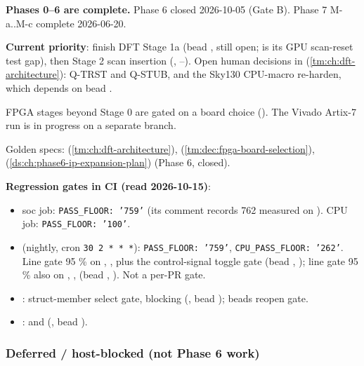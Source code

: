 \begin{record}

\textbf{Phases 0--6 are complete.} Phase 6 closed 2026-10-05 (Gate B).
Phase 7 M-a..M-c complete 2026-06-20.

\textbf{Current priority}: finish DFT Stage 1a (bead ,
still open;  is its GPU scan-reset test gap), then Stage 2
scan insertion (, --). Open human
decisions in  (\cref{tm:ch:dft-architecture}): Q-TRST and Q-STUB,
and the Sky130 CPU-macro re-harden, which depends on bead .

FPGA stages beyond Stage 0 are gated on a board choice ().
The Vivado Artix-7 run is in progress on a separate branch.

Golden specs:  (\cref{tm:ch:dft-architecture}),
 (\cref{tm:dec:fpga-board-selection}),
 (\cref{ds:ch:phase6-ip-expansion-plan}) (Phase 6, closed).

\textbf{Regression gates in CI (read 2026-10-15)}:

\begin{itemize}
\tightlist
\item
   soc job:
  \texttt{PASS\_\allowbreak{}FLOOR:\allowbreak{}\ '759'} (its comment
  records 762 measured on ). CPU job:
  \texttt{PASS\_\allowbreak{}FLOOR:\allowbreak{}\ '100'}.
\item
   (nightly, cron \texttt{30\ 2\ *\ *\ *}):
  \texttt{PASS\_\allowbreak{}FLOOR:\allowbreak{}\ '759'},
  \texttt{CPU\_\allowbreak{}PASS\_\allowbreak{}FLOOR:\allowbreak{}\ '262'}.
  Line gate 95 \% on , ,  plus
  the control-signal toggle gate (bead , ); line gate
  95 \% also on , ,  (bead
  , ). Not a per-PR gate.
\item
  : struct-member select gate, blocking (,
  bead ); beads reopen gate.
\item
  :  and
   (, bead ).
\end{itemize}

\end{record}

\subsubsection{Deferred / host-blocked (not Phase 6 work)}\label{cr:status:phase-status:deferred-host-blocked-not-phase-6-work}

